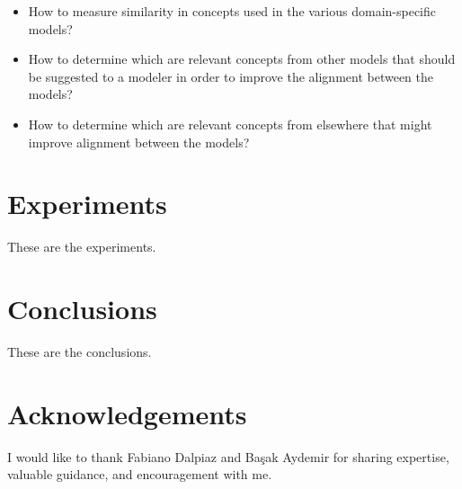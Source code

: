 \documentclass{article}
\begin{document}
\begin{itemize}
\item How to measure similarity in concepts used in the various domain-specific models?
\item How to determine which are relevant concepts from other models that should be suggested to a modeler in order to improve the alignment between the models?
\item How to determine which are relevant concepts from elsewhere that might improve alignment between the models?
\end{itemize}

\section{Experiments}

These are the experiments.

\section{Conclusions}

These are the conclusions.

\section{Acknowledgements}

I would like to thank Fabiano Dalpiaz and Ba\c sak Aydemir for sharing expertise, valuable guidance, and encouragement with me.

\printbibliography
\end{document}
